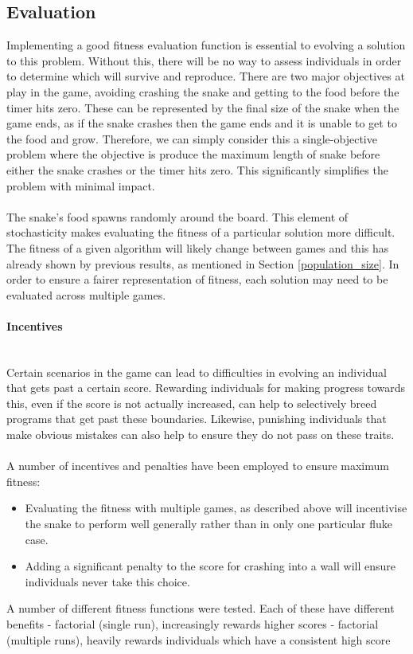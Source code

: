 \documentclass{article}
\newcommand{\myparagraph}[1]{\paragraph{#1}\mbox{}\\}
\begin{document}
\subsection{Evaluation}
\label{fitness_evaluation}
Implementing a good fitness evaluation function is essential to evolving a solution to this problem. Without this, there will be no way to assess individuals in order to determine which will survive and reproduce. There are two major objectives at play in the game, avoiding crashing the snake and getting to the food before the timer hits zero. These can be represented by the final size of the snake when the game ends, as if the snake crashes then the game ends and it is unable to get to the food and grow. Therefore, we can simply consider this a single-objective problem where the objective is produce the maximum length of snake before either the snake crashes or the timer hits zero. This significantly simplifies the problem with minimal impact.
\\\\
The snake's food spawns randomly around the board. This element of stochasticity makes evaluating the fitness of a particular solution more difficult. The fitness of a given algorithm will likely change between games and this has already shown by previous results, as mentioned in Section \ref{population_size}. In order to ensure a fairer representation of fitness, each solution may need to be evaluated across multiple games.

\myparagraph{Incentives}
Certain scenarios in the game can lead to difficulties in evolving an individual that gets past a certain score. Rewarding individuals for making progress towards this, even if the score is not actually increased, can help to selectively breed programs that get past these boundaries. Likewise, punishing individuals that make obvious mistakes can also help to ensure they do not pass on these traits.
\\\\
A number of incentives and penalties have been employed to ensure maximum fitness:
\begin{itemize}
	\item Evaluating the fitness with multiple games, as described above will incentivise the snake to perform well generally rather than in only one particular fluke case.
	\item Adding a significant penalty to the score for crashing into a wall will ensure individuals never take this choice.
\end{itemize}
A number of different fitness functions were tested.
Each of these have different benefits
- factorial (single run), increasingly rewards higher scores
- factorial (multiple runs), heavily rewards individuals which have a consistent high score
\end{document}

